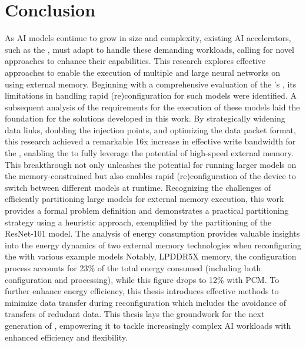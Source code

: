 \section{Conclusion}
As AI models continue to grow in size and complexity, existing AI accelerators, such as the \graicore{}, must adapt to handle these demanding workloads, calling for novel approaches to enhance their capabilities.
This research explores effective approaches to enable the execution of multiple and large neural networks on \graicore{} using external memory.
Beginning with a comprehensive evaluation of the \graicore{}'s \confignoc{}, its limitations in handling rapid (re)configuration for such models were identified.
A subsequent analysis of the requirements for the execution of these models laid the foundation for the solutions developed in this work.
By strategically widening data links, doubling the injection points, and optimizing the data packet format, this research achieved a remarkable 16x increase in effective write bandwidth for the \confignoc{}, enabling the \graicore{} to fully leverage the potential of high-speed external memory.
This breakthrough not only unleashes the potential for running larger models on the memory-constrained \graicore{} but also enables rapid (re)configuration of the device to switch between different models at runtime.
Recognizing the challenges of efficiently partitioning large models for external memory execution, this work provides a formal problem definition and demonstrates a practical partitioning strategy using a heuristic approach, exemplified by the partitioning of the ResNet-101 model.
The analysis of energy consumption provides valuable insights into the energy dynamics of two external memory technologies when reconfiguring the \graicore{} with various example models
Notably, LPDDR5X memory, the configuration process accounts for 23\% of the total energy consumed (including both configuration and processing), while this figure drops to 12\% with PCM.
To further enhance energy efficiency, this thesis introduces effective methods to minimize data transfer during reconfiguration which includes the avoidance of transfers of redudant data.
This thesis lays the groundwork for the next generation of \graicore{}, empowering it to tackle increasingly complex AI workloads with enhanced efficiency and flexibility.
